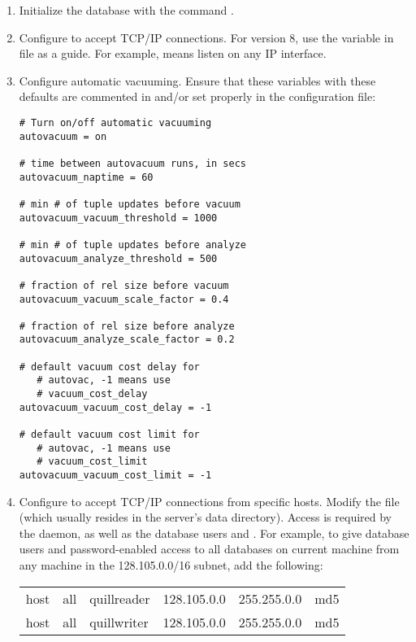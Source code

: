 \begin{enumerate}

\item Initialize the database with the  command 
\verb@initdb@.

\item Configure to accept TCP/IP connections.
For  version 8,
use the  variable in 
 file as a guide.
For example,
means listen on any IP interface.

\item Configure automatic vacuuming.
Ensure that these variables with these defaults are
commented in and/or set properly in the 
 configuration file:
\begin{verbatim}
# Turn on/off automatic vacuuming
autovacuum = on

# time between autovacuum runs, in secs
autovacuum_naptime = 60

# min # of tuple updates before vacuum
autovacuum_vacuum_threshold = 1000

# min # of tuple updates before analyze
autovacuum_analyze_threshold = 500

# fraction of rel size before vacuum
autovacuum_vacuum_scale_factor = 0.4 

# fraction of rel size before analyze
autovacuum_analyze_scale_factor = 0.2

# default vacuum cost delay for 
   # autovac, -1 means use 
   # vacuum_cost_delay
autovacuum_vacuum_cost_delay = -1  

# default vacuum cost limit for 
   # autovac, -1 means use
   # vacuum_cost_limit
autovacuum_vacuum_cost_limit = -1   
\end{verbatim}


\item Configure  to accept TCP/IP connections from 
specific hosts.
Modify the  file 
(which usually resides in the  server's data directory).
Access is required by the  daemon,
as well as the database users
 and .
For example, to give
database users  and 
password-enabled access to all databases on current machine from any
machine in the 128.105.0.0/16 subnet, add the following:

\begin{tabular}{llllll}
host&all&quillreader&128.105.0.0&255.255.0.0&md5\\
host&all&quillwriter&128.105.0.0&255.255.0.0&md5
\end{tabular}


\end{enumerate}
